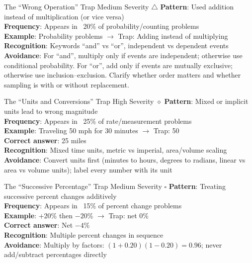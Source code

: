 \documentclass{article}
\begin{document}
\begin{trapbox}{The ``Wrong Operation'' Trap \colorbox{orange!20}{Medium Severity} $\triangle$}
\textbf{Pattern}: Used addition instead of multiplication (or vice versa)\\
\textbf{Frequency}: Appears in ~20\% of probability/counting problems\\
\textbf{Example}: Probability problems $\rightarrow$ Trap: Adding instead of multiplying\\
\textbf{Recognition}: Keywords ``and'' vs ``or'', independent vs dependent events\\
\textbf{Avoidance}: For ``and'', multiply only if events are independent; otherwise use conditional probability. For ``or'', add only if events are mutually exclusive; otherwise use inclusion--exclusion. Clarify whether order matters and whether sampling is with or without replacement.
\end{trapbox}

\begin{trapbox}{The ``Units and Conversions'' Trap \colorbox{red!20}{High Severity} $\diamond$}
\textbf{Pattern}: Mixed or implicit units lead to wrong magnitude\\
\textbf{Frequency}: Appears in ~25\% of rate/measurement problems\\
\textbf{Example}: Traveling 50 mph for 30 minutes $\rightarrow$ Trap: 50\\
\textbf{Correct answer}: 25 miles\\
\textbf{Recognition}: Mixed time units, metric vs imperial, area/volume scaling\\
\textbf{Avoidance}: Convert units first (minutes to hours, degrees to radians, linear vs area vs volume units); label every number with its unit
\end{trapbox}

\begin{trapbox}{The ``Successive Percentage'' Trap \colorbox{orange!20}{Medium Severity} $\square$}
\textbf{Pattern}: Treating successive percent changes additively\\
\textbf{Frequency}: Appears in ~15\% of percent change problems\\
\textbf{Example}: +20\% then $-20$\% $\rightarrow$ Trap: net 0\%\\
\textbf{Correct answer}: Net $-4$\%\\
\textbf{Recognition}: Multiple percent changes in sequence\\
\textbf{Avoidance}: Multiply by factors: $(1+0.20)(1-0.20)=0.96$; never add/subtract percentages directly
\end{trapbox}
\end{document}
